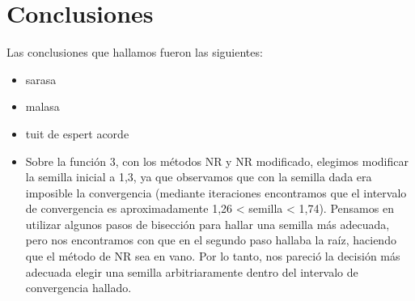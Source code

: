 \documentclass[titlepage,a4paper]{article}
\begin{document}
\section{Conclusiones}\label{sec:conclusiones}
Las conclusiones que hallamos fueron las siguientes:
\begin{itemize}
\item sarasa
\item malasa
\item tuit de espert acorde
\item Sobre la función 3, con los métodos NR y NR modificado, elegimos modificar la semilla inicial a 1,3, ya que observamos que con la semilla dada era imposible la convergencia (mediante iteraciones encontramos que el intervalo de convergencia es aproximadamente 1,26 < semilla < 1,74). Pensamos en utilizar algunos pasos de bisección para hallar una semilla más adecuada, pero nos encontramos con que en el segundo paso hallaba la raíz, haciendo que el método de NR sea en vano. Por lo tanto, nos pareció la decisión más adecuada elegir una semilla arbitriaramente dentro del intervalo de convergencia hallado.
\end{itemize}
\end{document}
